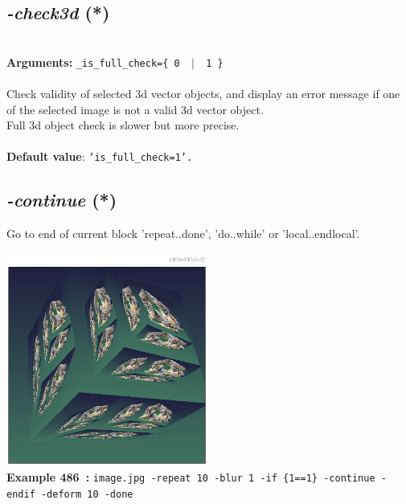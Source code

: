 \documentclass[a4paper,11pt,twoside]{book}
\begin{document}
\subsection{\emph{-check3d} (*)}\vspace*{-0.5em}
~\\\textbf{Arguments: } 
{\small \texttt{\_is\_full\_check=\{ 0 ~$|$~ 1 \}}}\\~\\
Check validity of selected 3d vector objects, and display an error message
if one of the selected image is not a valid 3d vector object.
~\\Full 3d object check is slower but more precise.
~\\~\\\textbf{Default value}: {\small \texttt{'is\_full\_check=1'.}}


\subsection{\emph{-continue} (*)}\vspace*{-0.5em}
Go to end of current block 'repeat..done', 'do..while' or 'local..endlocal'.
\begin{center}\includegraphics[keepaspectratio=true,height=7cm,width=\textwidth]{img/gmic_def486.jpg}\\
{\footnotesize \textbf{Example 486~:} \texttt{image.jpg -repeat 10 -blur 1 -if \{1==1\} -continue -endif -deform 10 -done}}
\end{center}
\end{document}
